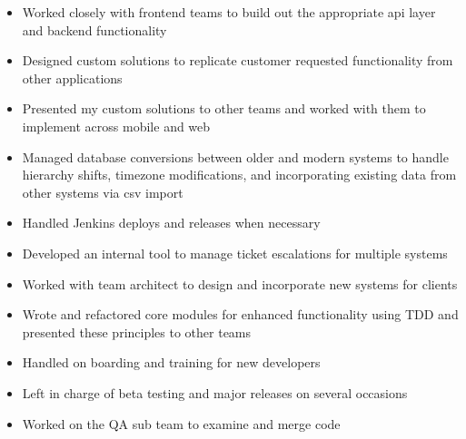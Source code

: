 \documentclass[10pt,a4paper,ragged2e]{altacv}
\begin{document}
\divider

\begin{itemize}
\item Worked closely with frontend teams to build out the appropriate api layer and backend functionality
\item Designed custom solutions to replicate customer requested functionality from other applications
\item Presented my custom solutions to other teams and worked with them to implement across mobile
and web
\item Managed database conversions between older and modern systems to handle hierarchy shifts,
timezone modifications, and incorporating existing data from other systems via csv import
\item Handled Jenkins deploys and releases when necessary
\end{itemize}

\divider

\begin{itemize}
\item Developed an internal tool to manage ticket escalations for multiple systems
\item Worked with team architect to design and incorporate new systems for clients
\item Wrote and refactored core modules for enhanced functionality using TDD and presented these principles to other teams
\item Handled on boarding and training for new developers
\item Left in charge of beta testing and major releases on several occasions
\item Worked on the QA sub team to examine and merge code
\end{itemize}

\divider

%
\end{document}
